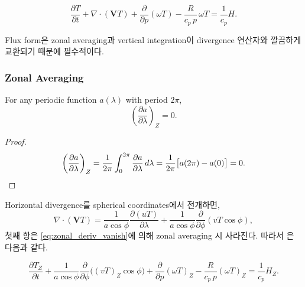 \begin{equation}\label{eq:thermo_flux}
  \boxed{
  \frac{\partial T}{\partial t}
    + \nabla\cdot(\mathbf{V}T)
    + \frac{\partial}{\partial p}(\omega T)
    - \frac{R}{c_p\,p}\,\omega T
  = \frac{1}{c_p}H.
  }
\end{equation}

\begin{remark}
Flux form은 zonal averaging과 vertical integration이
divergence 연산자와 깔끔하게 교환되기 때문에 필수적이다.
\end{remark}

\subsubsection{Zonal Averaging}

\begin{proposition}
For any periodic function $a(\lambda)$ with period $2\pi$,
\begin{equation}\label{eq:zonal_deriv_vanish}
  \left(\frac{\partial a}{\partial \lambda}\right)_Z = 0.
\end{equation}
\end{proposition}


\begin{proof}
\[
  \left(\frac{\partial a}{\partial \lambda}\right)_Z
  = \frac{1}{2\pi}\int_0^{2\pi}\frac{\partial a}{\partial\lambda}\,d\lambda
  = \frac{1}{2\pi}\bigl[a(2\pi)-a(0)\bigr] = 0.\qedhere
\]
\end{proof}

\noindent
Horizontal divergence를 spherical coordinates에서 전개하면,
\[
  \nabla\cdot(\mathbf{V}T)
  = \frac{1}{a\cos\phi}\frac{\partial(uT)}{\partial\lambda}
    + \frac{1}{a\cos\phi}\frac{\partial}{\partial\phi}(vT\cos\phi),
\]
첫째 항은 \eqref{eq:zonal_deriv_vanish}에 의해 zonal averaging 시 사라진다.
따라서 은 다음과 같다.

\begin{equation}\label{eq:thermo_zonal}
  \frac{\partial T_Z}{\partial t}
    + \frac{1}{a\cos\phi}\frac{\partial}{\partial\phi}\bigl((vT)_Z\cos\phi\bigr)
    + \frac{\partial}{\partial p}(\omega T)_Z
    - \frac{R}{c_p\,p}(\omega T)_Z
  = \frac{1}{c_p}H_Z.
\end{equation}

